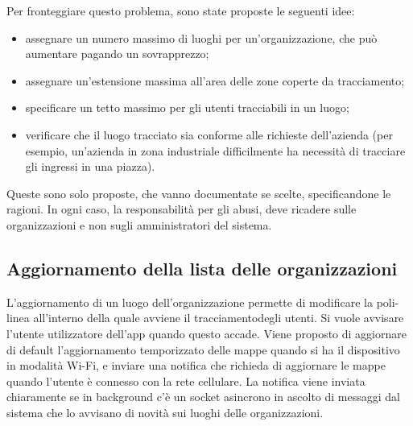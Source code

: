 Per fronteggiare questo problema, sono state proposte le seguenti idee:
\begin{itemize}
	\item assegnare un numero massimo di luoghi per un'organizzazione, che può aumentare pagando un sovrapprezzo;
	\item assegnare un'estensione massima all'area delle zone coperte da tracciamento;
	\item specificare un tetto massimo per gli utenti tracciabili in un luogo;
	\item verificare che il luogo tracciato sia conforme alle richieste dell'azienda (per esempio, un'azienda in zona industriale difficilmente ha necessità di tracciare gli ingressi in una piazza).
\end{itemize}
Queste sono solo proposte, che vanno documentate se scelte, specificandone le ragioni. In ogni caso, la responsabilità per gli abusi, deve ricadere sulle organizzazioni e non sugli amministratori del sistema.

\subsection*{Aggiornamento della lista delle organizzazioni}
L'aggiornamento di un luogo dell'organizzazione permette di modificare la poli-linea all'interno della quale avviene il tracciamentodegli utenti. Si vuole avvisare l'utente utilizzatore dell'app quando questo accade.
Viene proposto di aggiornare di default l'aggiornamento temporizzato delle mappe quando si ha il dispositivo in modalità Wi-Fi, e inviare una notifica che richieda di aggiornare le mappe quando l'utente è connesso con la rete cellulare.
La notifica viene inviata chiaramente se in background c'è un socket asincrono in ascolto di messaggi dal sistema che lo avvisano di novità sui luoghi delle organizzazioni.

\clearpage